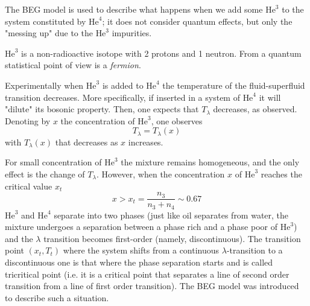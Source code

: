 \documentclass[../../Main/Main.tex]{subfiles}
\begin{document}
 The BEG model is used to describe what happens when we add some \( \text{He}^3 \) to the system constituted by \( \text{He}^4 \); it does not consider quantum effects, but only the "messing up" due to the \( \text{He}^3 \) impurities.
 
 \begin{remark}
  
\( \text{He}^3 \) is a non-radioactive isotope with 2 protons and 1 neutron. From a quantum statistical point of view is a \emph{fermion}.
 \end{remark}

Experimentally when \( \text{He}^3 \)
 is added to \( \text{He}^4 \) the temperature of the fluid-superfluid transition decreases. 
More specifically, if inserted in a system of \( \text{He}^4 \) it will "dilute" its bosonic property. Then, one expects that \( T_ \lambda  \) decreases, as observed. Denoting by \( x \) the concentration of \( \text{He}^3 \),  one observes
\begin{equation*}
  T_{\lambda} = T_ \lambda (x)
\end{equation*}
with \( T_ \lambda (x) \)  that decreases as \( x \) increases.

For small concentration of \( \text{He}^3 \) the mixture remains homogeneous, and the only effect is the change of \( T_ \lambda  \). However, when the concentration \(x\) of \( \text{He}^3 \) reaches the critical value \(x_t\)
\begin{equation*}
  x > x_t = \frac{n_3}{n_3+n_4} \sim 0.67
\end{equation*}
\( \text{He}^3 \) and \( \text{He}^4 \) separate into two phases  (just like oil separates from water, the mixture undergoes a separation between a phase rich and a phase poor of \( \text{He}^3 \))  and the \(\lambda\) transition becomes first-order (namely, discontinuous). The transition point \( (x_t,T_t) \) where the system shifts from a continuous \(\lambda\)-transition to a discontinuous one is that where the phase separation starts and is called tricritical point (i.e. it is a critical point that separates a line of second order transition from a line of first order transition). 
The BEG model was introduced to describe such a situation.
\end{document}

